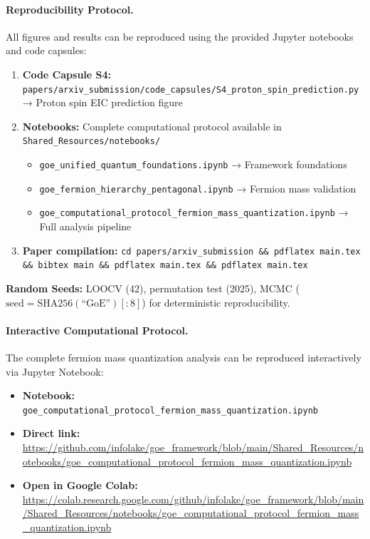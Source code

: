 \documentclass[12pt]{article}
\begin{document}
\paragraph{Reproducibility Protocol.}
All figures and results can be reproduced using the provided Jupyter notebooks and code capsules:
\begin{enumerate}
\item \textbf{Code Capsule S4:} \texttt{papers/arxiv\_submission/code\_capsules/S4\_proton\_spin\_prediction.py} → Proton spin EIC prediction figure
\item \textbf{Notebooks:} Complete computational protocol available in \texttt{Shared\_Resources/notebooks/}
\begin{itemize}
\item \texttt{goe\_unified\_quantum\_foundations.ipynb} → Framework foundations
\item \texttt{goe\_fermion\_hierarchy\_pentagonal.ipynb} → Fermion mass validation
\item \texttt{goe\_computational\_protocol\_fermion\_mass\_quantization.ipynb} → Full analysis pipeline
\end{itemize}
\item \textbf{Paper compilation:} \texttt{cd papers/arxiv\_submission \&\& pdflatex main.tex \&\& bibtex main \&\& pdflatex main.tex \&\& pdflatex main.tex}
\end{enumerate}

\noindent\textbf{Random Seeds:} LOOCV (42), permutation test (2025), MCMC ($\text{seed} = \text{SHA256}(\text{``GoE''})[:8]$) for deterministic reproducibility.

\paragraph{Interactive Computational Protocol.}
The complete fermion mass quantization analysis can be reproduced interactively via Jupyter Notebook:

\begin{itemize}
\item \textbf{Notebook:} \texttt{goe\_computational\_protocol\_fermion\_mass\_quantization.ipynb}
\item \textbf{Direct link:} \url{https://github.com/infolake/goe_framework/blob/main/Shared_Resources/notebooks/goe_computational_protocol_fermion_mass_quantization.ipynb}
\item \textbf{Open in Google Colab:} \url{https://colab.research.google.com/github/infolake/goe_framework/blob/main/Shared_Resources/notebooks/goe_computational_protocol_fermion_mass_quantization.ipynb}
\end{itemize}
\end{document}
